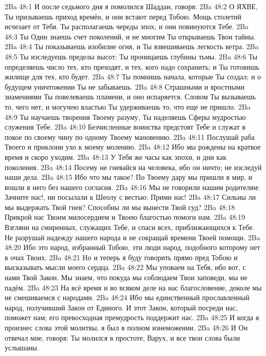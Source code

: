 \vs 2Ba 48:1
И после седьмого дня я помолился Шаддаи, говоря:
\vs 2Ba 48:2
О ЯХВЕ, Ты призываешь приход времён, и они встают перед Тобою. Мощь столетий исчезает от Тебя. Ты располагаешь череды эпох, и они повинуются Тебе.
\vs 2Ba 48:3
Ты Один знаешь счет поколений, и не многим Ты открываешь Твои тайны.
\vs 2Ba 48:4
Ты показываешь изобилие огня, и Ты взвешиваешь легкость ветра.
\vs 2Ba 48:5
Ты изследуешь пределы высот; Ты проницаешь глубины тьмы.
\vs 2Ba 48:6
Ты определяешь число тех, кто преходят, и тех, кого надо сохранить; и Ты готовишь жилище для тех, кто будет.
\vs 2Ba 48:7
Ты помнишь начала, которые Ты создал; и о будущем уничтожении Ты не забываешь.
\vs 2Ba 48:8
Страшными и яростными знамениями Ты повелеваешь пламени, и оно испаряется. Словом Ты вызываешь то, чего нет, и могучею властью Ты удерживаешь то, что еще не пришло.
\vs 2Ba 48:9
Ты научаешь творения Твоему разуму, Ты наделяешь Сферы мудростью служения Тебе.
\vs 2Ba 48:10
Безчисленные воинства предстоят Тебе и служат в покое по своему чину по одному Твоему мановению.
\vs 2Ba 48:11
Послушай раба Твоего и приклони ухо к моему молению.
\vs 2Ba 48:12
Ибо мы рождены на краткое время и скоро уходим.
\vs 2Ba 48:13
У Тебя же часы как эпохи, и дни как поколения.
\vs 2Ba 48:14
Посему не гневайся на человека, ибо он ничто; не изследуй наши дела.
\vs 2Ba 48:15
Ибо что мы такое? По Твоему дару мы пришли в мир, и вошли в него без нашего согласия.
\vs 2Ba 48:16
Мы не говорили нашим родителям: Зачните нас!, ни посылали к Шеолу с вестью: Прими нас!
\vs 2Ba 48:17
Сильны ли мы выдержать Твой гнев? Способны ли мы вынести Твой суд?
\vs 2Ba 48:18
Прикрой нас Твоим милосердием и Твоею благостью помоги нам.
\vs 2Ba 48:19
Взгляни на смиренных, служащих Тебе, и спаси всех, приближающихся к Тебе. Не разрушай надежду нашего народа и не сокращай времени Твоей помощи.
\vs 2Ba 48:20
Ибо это народ, избранный Тобою, эти люди народ, подобного которому нет в очах Твоих.
\vs 2Ba 48:21
Но и теперь я буду говорить прямо пред Тобою и высказывать мысли моего сердца.
\vs 2Ba 48:22
Мы уповаем на Тебя, ибо вот, с нами Твой Закон. Мы знаем, что покуда мы соблюдаем Твои заповеди, мы не падём.
\vs 2Ba 48:23
На всё время и во всяком деле на нас благословение, доколе мы не смешиваемся с народами.
\vs 2Ba 48:24
Ибо мы единственный прославленный народ, получивший Закон от Единого. И этот Закон, который посреди нас, поможет нам; его превосходная премудрость поддержит нас.
\vs 2Ba 48:25
И когда я произнес слова этой молитвы, я был в полном изнеможении.
\vs 2Ba 48:26
И Он отвечал мне, говоря: Ты молился в простоте, Варух, и все твои слова были услышаны.
